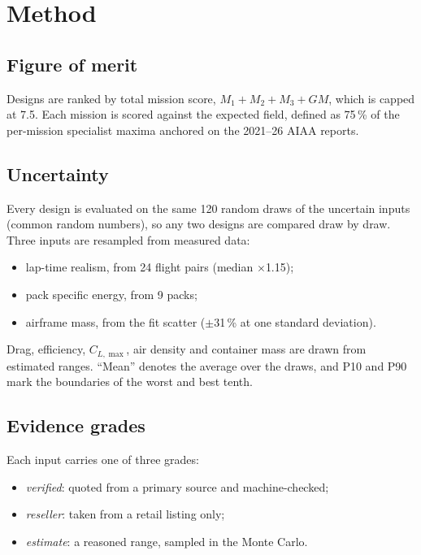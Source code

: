 \documentclass[final]{dbfdoc}
\begin{document}
\vspace{6pt}
\noindent{}

\section{Method}
\subsection{Figure of merit}
Designs are ranked by total mission score, $M_1 + M_2 + M_3 + GM$, which is capped at 7.5. Each mission is scored against the expected field, defined as 75\,\% of the per-mission specialist maxima anchored on the 2021--26 AIAA reports.

\subsection{Uncertainty}
Every design is evaluated on the same 120 random draws of the uncertain inputs (common random numbers), so any two designs are compared draw by draw. Three inputs are resampled from measured data:
\begin{itemize}
\item lap-time realism, from 24 flight pairs (median $\times$1.15);
\item pack specific energy, from 9 packs;
\item airframe mass, from the fit scatter ($\pm$31\,\% at one standard deviation).
\end{itemize}
Drag, efficiency, $C_{L,\max}$, air density and container mass are drawn from estimated ranges. ``Mean'' denotes the average over the draws, and P10 and P90 mark the boundaries of the worst and best tenth.

\subsection{Evidence grades}
Each input carries one of three grades:
\begin{itemize}
\item \emph{verified}: quoted from a primary source and machine-checked;
\item \emph{reseller}: taken from a retail listing only;
\item \emph{estimate}: a reasoned range, sampled in the Monte Carlo.
\end{itemize}
\end{document}

